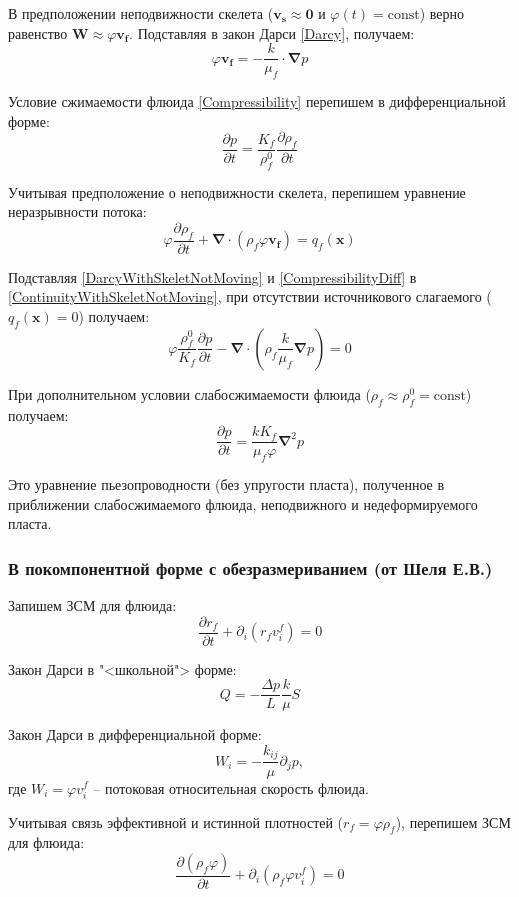 \documentclass[a4paper,12pt]{article}
\newcommand{\beq}{\begin{equation}}
\newcommand{\eeq}{\end{equation}}
\begin{document}
В предположении неподвижности скелета ($\pmb{v_s}\approx \pmb{0}$ и $\varphi(t)=\textrm{const}$) верно равенство $\pmb{W}\approx\varphi \pmb{v_f}$. Подставляя в закон Дарси \eqref{Darcy}, получаем:
\beq\label{DarcyWithSkeletNotMoving}
\varphi \pmb{v_f}=-\frac{k}{\mu_f}\cdot\pmb{\nabla} p
\eeq

Условие сжимаемости флюида \eqref{Compressibility} перепишем в дифференциальной форме:
\beq\label{CompressibilityDiff}
\frac{\partial p}{\partial t}=\frac{K_f}{\rho_f^0}\frac{\partial\rho_f}{\partial t}
\eeq

Учитывая предположение о неподвижности скелета, перепишем уравнение неразрывности потока:
\beq\label{ContinuityWithSkeletNotMoving}
\varphi\frac{\partial\rho_f}{\partial t}+\pmb{\nabla}\cdot\left(\rho_f\varphi\pmb{v_f}\right)=q_f(\pmb{x})
\eeq

Подставляя \eqref{DarcyWithSkeletNotMoving} и \eqref{CompressibilityDiff} в \eqref{ContinuityWithSkeletNotMoving}, при отсутствии источникового слагаемого ($q_f(\pmb{x})=0$) получаем:
\beq
\varphi\frac{\rho_f^0}{K_f}\frac{\partial p}{\partial t}-\pmb{\nabla}\cdot\left(\rho_f\frac{k}{\mu_f}\pmb{\nabla} p\right)=0
\eeq

При дополнительном условии слабосжимаемости флюида ($\rho_f\approx\rho_f^0=\textrm{const}$) получаем:
\beq
\frac{\partial p}{\partial t}=\frac{kK_f}{\mu_f\varphi}\pmb{\nabla}^2p
\eeq

Это уравнение пьезопроводности (без упругости пласта), полученное в приближении слабосжимаемого флюида, неподвижного и недеформируемого пласта.

\subsubsection{В покомпонентной форме с обезразмериванием (от Шеля Е.В.)}

Запишем ЗСМ для флюида:
\beq
\frac{\partial r_f}{\partial t}+\partial_i\left(r_f v_i^f\right)=0
\eeq

Закон Дарси в "<школьной"> форме:
\beq
Q=-\frac{\Delta p}{L}\frac{k}{\mu}S
\eeq

Закон Дарси в дифференциальной форме:
\beq\label{DarcyDiffShel}
W_i=-\frac{k_{ij}}{\mu}\partial_j p,
\eeq
где $W_i=\varphi v_i^f$ -- потоковая относительная скорость флюида.

Учитывая связь эффективной и истинной плотностей ($r_f=\varphi\rho_f$), перепишем ЗСМ для флюида:
\beq\label{ContinuityShel}
\frac{\partial\left(\rho_f\varphi\right)}{\partial t}+\partial_i\left(\rho_f\varphi v_i^f\right)=0
\eeq
\end{document}

